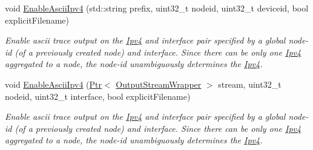\begin{DoxyCompactItemize}
void \hyperlink{classns3_1_1AsciiTraceHelperForIpv4_a3236637d69308d718e38cfacf286a4bd}{Enable\+Ascii\+Ipv4} (std\+::string prefix, uint32\+\_\+t nodeid, uint32\+\_\+t deviceid, bool explicit\+Filename)
\begin{DoxyCompactList}\small\item\em Enable ascii trace output on the \hyperlink{classns3_1_1Ipv4}{Ipv4} and interface pair specified by a global node-\/id (of a previously created node) and interface. Since there can be only one \hyperlink{classns3_1_1Ipv4}{Ipv4} aggregated to a node, the node-\/id unambiguously determines the \hyperlink{classns3_1_1Ipv4}{Ipv4}. \end{DoxyCompactList}\item 
void \hyperlink{classns3_1_1AsciiTraceHelperForIpv4_a8766aff9fcd7a0a4344330fb23f9da19}{Enable\+Ascii\+Ipv4} (\hyperlink{classns3_1_1Ptr}{Ptr}$<$ \hyperlink{classns3_1_1OutputStreamWrapper}{Output\+Stream\+Wrapper} $>$ stream, uint32\+\_\+t nodeid, uint32\+\_\+t interface, bool explicit\+Filename)
\begin{DoxyCompactList}\small\item\em Enable ascii trace output on the \hyperlink{classns3_1_1Ipv4}{Ipv4} and interface pair specified by a global node-\/id (of a previously created node) and interface. Since there can be only one \hyperlink{classns3_1_1Ipv4}{Ipv4} aggregated to a node, the node-\/id unambiguously determines the \hyperlink{classns3_1_1Ipv4}{Ipv4}. \end{DoxyCompactList}\end{DoxyCompactItemize}
